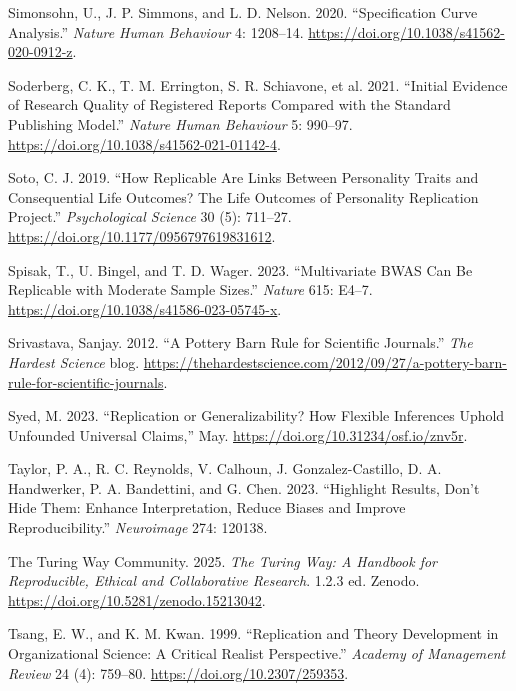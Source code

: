\documentclass[
  letterpaper,
  DIV=11,
  openany,
  fontsize=12pt,
  parskip=half,
  headings=big,
  numbers=noenddot,
  titlepage=false]{scrreprt}
\newlength{\cslhangindent}
\newenvironment{CSLReferences}[2] %
 {\begin{list}{}{%
  \setlength{\itemindent}{0pt}
  \setlength{\leftmargin}{0pt}
  \setlength{\parsep}{0pt}
  \ifodd #1
   \setlength{\leftmargin}{\cslhangindent}
   \setlength{\itemindent}{-1\cslhangindent}
  \fi
  \setlength{\itemsep}{#2\baselineskip}}}
 {\end{list}}
\begin{document}
\begin{CSLReferences}{1}{0}
Simonsohn, U., J. P. Simmons, and L. D. Nelson. 2020. {``Specification
Curve Analysis.''} \emph{Nature Human Behaviour} 4: 1208--14.
\url{https://doi.org/10.1038/s41562-020-0912-z}.

Soderberg, C. K., T. M. Errington, S. R. Schiavone, et al. 2021.
{``Initial Evidence of Research Quality of Registered Reports Compared
with the Standard Publishing Model.''} \emph{Nature Human Behaviour} 5:
990--97. \url{https://doi.org/10.1038/s41562-021-01142-4}.

Soto, C. J. 2019. {``How Replicable Are Links Between Personality Traits
and Consequential Life Outcomes? The Life Outcomes of Personality
Replication Project.''} \emph{Psychological Science} 30 (5): 711--27.
\url{https://doi.org/10.1177/0956797619831612}.

Spisak, T., U. Bingel, and T. D. Wager. 2023. {``Multivariate BWAS Can
Be Replicable with Moderate Sample Sizes.''} \emph{Nature} 615: E4--7.
\url{https://doi.org/10.1038/s41586-023-05745-x}.

Srivastava, Sanjay. 2012. {``A Pottery Barn Rule for Scientific
Journals.''} \emph{The Hardest Science} blog.
\url{https://thehardestscience.com/2012/09/27/a-pottery-barn-rule-for-scientific-journals}.

Syed, M. 2023. {``Replication or Generalizability? How Flexible
Inferences Uphold Unfounded Universal Claims,''} May.
\url{https://doi.org/10.31234/osf.io/znv5r}.

Taylor, P. A., R. C. Reynolds, V. Calhoun, J. Gonzalez-Castillo, D. A.
Handwerker, P. A. Bandettini, and G. Chen. 2023. {``Highlight Results,
Don't Hide Them: Enhance Interpretation, Reduce Biases and Improve
Reproducibility.''} \emph{Neuroimage} 274: 120138.

The Turing Way Community. 2025. \emph{The Turing Way: A Handbook for
Reproducible, Ethical and Collaborative Research}. 1.2.3 ed. Zenodo.
\url{https://doi.org/10.5281/zenodo.15213042}.

Tsang, E. W., and K. M. Kwan. 1999. {``Replication and Theory
Development in Organizational Science: A Critical Realist
Perspective.''} \emph{Academy of Management Review} 24 (4): 759--80.
\url{https://doi.org/10.2307/259353}.


\end{CSLReferences}
\end{document}
